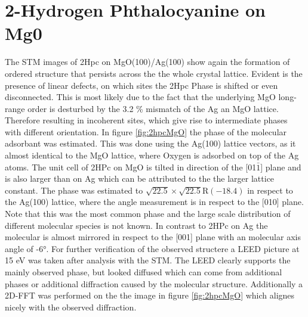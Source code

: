 \newpage
\section{2-Hydrogen Phthalocyanine on Mg0}
The STM images of 2Hpc on MgO(100)/Ag(100) show again the formation of ordered structure that persists across the the whole crystal lattice.
Evident is the presence of linear defects, on which sites the 2Hpc Phase is shifted or even disconnected. 
This is most likely due to the fact that the underlying MgO long-range order is desturbed by the 3.2 \% mismatch of the Ag an MgO lattice.
Therefore resulting in incoherent sites, which give rise to intermediate phases with different orientation.
In figure \ref{fig:2hpcMgO} the phase of the molecular adsorbant was estimated.
This was done using the Ag(100) lattice vectors, as it almost identical to the MgO lattice, where Oxygen is adsorbed on top of the Ag atoms.
The unit cell of 2HPc on MgO is tilted in direction of the [01$\bar{1}$] plane and is also larger than on Ag which can be attributed to the the larger lattice constant.
The phase was estimated to $\sqrt{22.5} \times  \sqrt{22.5}\text{R}(-18.4)$ in respect to the Ag(100) lattice, where the angle measurement is in respect to the [010] plane.
Note that this was the most common phase and the large scale distribution of different molecular species is not known.
In contrast to 2HPc on Ag the molecular is almost mirrored in respect to the [001] plane with an molecular axis angle of -6°.
\noindent
For further verification of the observed structere a LEED picture at 15 eV was taken after analysis with the STM.
The LEED clearly supports the mainly observed phase, but looked diffused which can come from additional phases or additional diffraction caused by the molecular structure.
Additionally a 2D-FFT was performed on the the image in figure \ref{fig:2hpcMgO} which alignes nicely with the observed diffraction.

